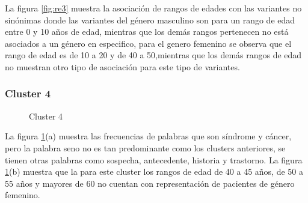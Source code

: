 La figura \ref{fig:re3} muestra la asociación de rangos de edades con las variantes no sinónimas donde las variantes del género masculino son para un rango de edad entre 0 y 10 años de edad, mientras que los demás rangos pertenecen no está asociados a un género en especifico, para el genero femenino se observa que el rango de edad es de 10 a 20 y de 40 a 50,mientras que los demás rangos de edad no muestran otro tipo de asociación para este tipo de variantes.  

\subsubsection*{Cluster 4}
\begin{figure}[H]
	\centering
	\caption{Cluster 4} \label{fig:c4}
\end{figure}

La figura \ref{fig:c4}(a) muestra las frecuencias de palabras que son síndrome y cáncer, pero la palabra seno no es tan predominante como los clusters anteriores, se tienen otras palabras como sospecha, antecedente, historia y trastorno. La figura \ref{fig:c4}(b) muestra que la para este cluster los rangos de edad de 40 a 45 años, de 50 a 55 años y mayores de 60 no cuentan con representación de pacientes de género femenino.

